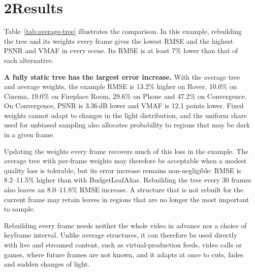 \documentclass[10pt]{article}
\begin{document}
\section*{2\quad Results}

Table~\ref{tab:average-tree} illustrates the comparison. In this example, rebuilding the tree and its weights every frame gives the lowest RMSE and the highest PSNR and VMAF in every scene. Its RMSE is at least 7\% lower than that of each alternative.

\textbf{A fully static tree has the largest error increase.} With the average tree and average weights, the example RMSE is 13.2\% higher on Rover, 10.0\% on Cinema, 19.0\% on Fireplace Room, 29.6\% on Phone and 47.2\% on Convergence. On Convergence, PSNR is 3.36\,dB lower and VMAF is 12.1 points lower. Fixed weights cannot adapt to changes in the light distribution, and the uniform share used for unbiased sampling also allocates probability to regions that may be dark in a given frame.

Updating the weights every frame recovers much of this loss in the example. The average tree with per-frame weights may therefore be acceptable when a modest quality loss is tolerable, but its error increase remains non-negligible: RMSE is 8.2--11.5\% higher than with BudgetLeafAlias. Rebuilding the tree every 30 frames also leaves an 8.0--11.8\% RMSE increase. A structure that is not rebuilt for the current frame may retain leaves in regions that are no longer the most important to sample.

Rebuilding every frame needs neither the whole video in advance nor a choice of keyframe interval. Unlike average structures, it can therefore be used directly with live and streamed content, such as virtual-production feeds, video calls or games, where future frames are not known, and it adapts at once to cuts, fades and sudden changes of light.


\end{document}
